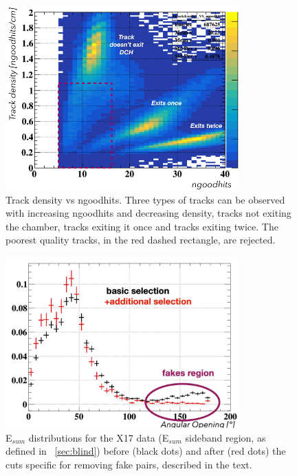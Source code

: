 \begin{refsection}
        \begin{figure}[]
            \centering
            \includegraphics[width=0.8\textwidth]{Figures/X17/Analysis/halfturn_cond.png}
            \caption[X17: track selection]{Track density vs ngoodhits. Three types of tracks can be observed with increasing ngoodhits and decreasing density, tracks not exiting the chamber, tracks exiting it once and tracks exiting twice. The poorest quality tracks, in the red dashed rectangle, are rejected.}
            \label{fig:X17:tracks}
        \end{figure}

        \begin{figure}[]
            \centering
            \includegraphics[width=0.8\textwidth]{Figures/X17/Analysis/Fake.pdf}
            \caption[X17: fake pair rejection]{E$_{sum}$ distributions for the X17 data (E$_{sum}$ sideband region, as defined in ~\ref{sec:blind}) before (black dots) and after (red dots) the cuts specific for removing fake pairs, described in the text.}
            \label{fig:X17:fakes}
        \end{figure}


\end{refsection}
